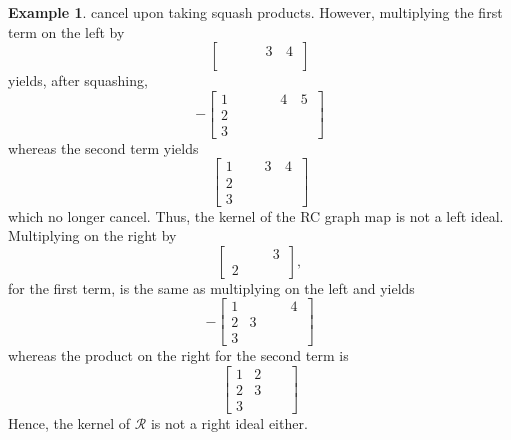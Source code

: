\documentclass{amsart}
\theoremstyle{definition}
\newtheorem{example}[lemma]{Example}
\theoremstyle{remark}
\numberwithin{equation}{subsection}
\begin{document}
\begin{example}
cancel upon taking squash products. However, multiplying the first term on the left by 
$$\left[\begin{matrix}\mathtt{\text{ }} & \mathtt{\text{ }} & 3 & 4\\\mathtt{\text{ }} & \mathtt{\text{ }} & \mathtt{\text{ }} & \mathtt{\text{ }}\\\mathtt{\text{ }} & \mathtt{\text{ }} & \mathtt{\text{ }} & \mathtt{\text{ }}\end{matrix}\right]$$
yields, after squashing,
$$-\left[\begin{matrix}1 & \mathtt{\text{ }} & \mathtt{\text{ }} & 4 & 5\\2 & \mathtt{\text{ }} & \mathtt{\text{ }} & \mathtt{\text{ }} & \mathtt{\text{ }}\\3 & \mathtt{\text{ }} & \mathtt{\text{ }} & \mathtt{\text{ }} & \mathtt{\text{ }}\end{matrix}\right]$$
whereas the second term yields
$$\left[\begin{matrix}1 & \mathtt{\text{ }} & 3 & 4\\2 & \mathtt{\text{ }} & \mathtt{\text{ }} & \mathtt{\text{ }}\\3 & \mathtt{\text{ }} & \mathtt{\text{ }} & \mathtt{\text{ }}\end{matrix}\right]$$
which no longer cancel. Thus, the kernel of the RC graph map is not a left ideal. Multiplying on the right by 
$$\left[\begin{matrix}\mathtt{\text{ }} & \mathtt{\text{ }} & 3\\2 & \mathtt{\text{ }} & \mathtt{\text{ }}\end{matrix}\right],$$
for the first term, is the same as multiplying on the left and yields
$$-\left[\begin{matrix}1 & \mathtt{\text{ }} & \mathtt{\text{ }} & 4\\2 & 3 & \mathtt{\text{ }} & \mathtt{\text{ }}\\3 & \mathtt{\text{ }} & \mathtt{\text{ }} & \mathtt{\text{ }}\end{matrix}\right]$$
whereas the product on the right for the second term is
$$\left[\begin{matrix}1 & 2 & \mathtt{\text{ }}\\2 & 3 & \mathtt{\text{ }}\\3 & \mathtt{\text{ }} & \mathtt{\text{ }}\end{matrix}\right]$$
Hence, the kernel of $\mathcal{R}$ is not a right ideal either.
\end{example}
\end{document}
